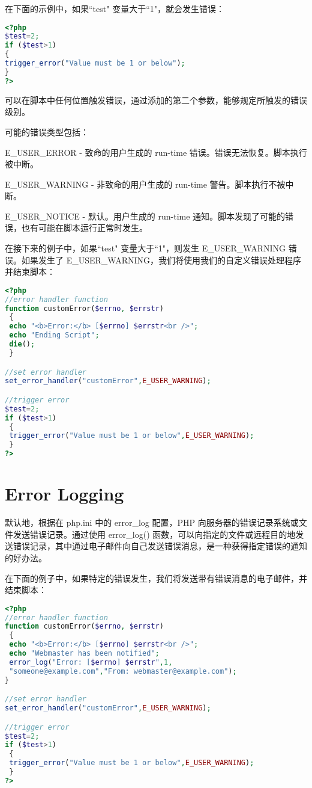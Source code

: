 在下面的示例中，如果``test" 变量大于``1"，就会发生错误：

\begin{lstlisting}[language=PHP]
<?php
$test=2;
if ($test>1)
{
trigger_error("Value must be 1 or below");
}
?>
\end{lstlisting}

可以在脚本中任何位置触发错误，通过添加的第二个参数，能够规定所触发的错误级别。

可能的错误类型包括：

\begin{compactitem}
\item E\_USER\_ERROR - 致命的用户生成的 run-time 错误。错误无法恢复。脚本执行被中断。
\item E\_USER\_WARNING - 非致命的用户生成的 run-time 警告。脚本执行不被中断。
\item E\_USER\_NOTICE - 默认。用户生成的 run-time 通知。脚本发现了可能的错误，也有可能在脚本运行正常时发生。
\end{compactitem}


在接下来的例子中，如果``test" 变量大于``1"，则发生 E\_USER\_WARNING 错误。如果发生了 E\_USER\_WARNING，我们将使用我们的自定义错误处理程序并结束脚本：


\begin{lstlisting}[language=PHP]
<?php
//error handler function
function customError($errno, $errstr)
 { 
 echo "<b>Error:</b> [$errno] $errstr<br />";
 echo "Ending Script";
 die();
 }

//set error handler
set_error_handler("customError",E_USER_WARNING);

//trigger error
$test=2;
if ($test>1)
 {
 trigger_error("Value must be 1 or below",E_USER_WARNING);
 }
?>
\end{lstlisting}

\section{Error Logging}


默认地，根据在 php.ini 中的 error\_log 配置，PHP 向服务器的错误记录系统或文件发送错误记录。通过使用 error\_log() 函数，可以向指定的文件或远程目的地发送错误记录，其中通过电子邮件向自己发送错误消息，是一种获得指定错误的通知的好办法。


在下面的例子中，如果特定的错误发生，我们将发送带有错误消息的电子邮件，并结束脚本：

\begin{lstlisting}[language=PHP]
<?php
//error handler function
function customError($errno, $errstr)
 { 
 echo "<b>Error:</b> [$errno] $errstr<br />";
 echo "Webmaster has been notified";
 error_log("Error: [$errno] $errstr",1,
 "someone@example.com","From: webmaster@example.com");
}

//set error handler
set_error_handler("customError",E_USER_WARNING);

//trigger error
$test=2;
if ($test>1)
 {
 trigger_error("Value must be 1 or below",E_USER_WARNING);
 }
?>
\end{lstlisting}

